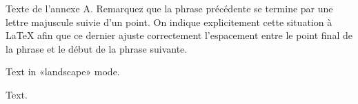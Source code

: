 Texte de l'annexe A\@. Remarquez que la phrase précédente se termine
par une lettre majuscule suivie d'un point. On indique explicitement
cette situation à \LaTeX{} afin que ce dernier ajuste correctement
l'espacement entre le point final de la phrase et le début de la
phrase suivante.


\begin{landscape}
Text in «landscape» mode. 
\end{landscape}

Text.

